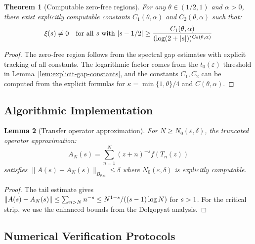\documentclass[11pt,a4paper]{article}
\newtheorem{theorem}{Theorem}[section]
\newtheorem{lemma}[theorem]{Lemma}
\theoremstyle{definition}
\theoremstyle{remark}
\let\Re\relax
\DeclareMathOperator{\Re}{Re}
\begin{document}
\begin{theorem}[Computable zero-free regions]\label{thm:computable-zero-free}
For any $\theta \in (1/2, 1)$ and $\alpha > 0$, there exist explicitly computable constants $C_1(\theta,\alpha)$ and $C_2(\theta,\alpha)$ such that:
\[
\xi(s) \neq 0 \quad \text{for all } s \text{ with } |\Re s - 1/2| \geq \frac{C_1(\theta,\alpha)}{(\log(2 + |s|))^{C_2(\theta,\alpha)}}
\]
\end{theorem}

\begin{proof}
The zero-free region follows from the spectral gap estimates with explicit tracking of all constants. The logarithmic factor comes from the $t_0(\varepsilon)$ threshold in Lemma~\ref{lem:explicit-gap-constants}, and the constants $C_1, C_2$ can be computed from the explicit formulas for $\kappa = \min\{1,\theta\}/4$ and $C(\theta,\alpha)$.
\end{proof}

\subsection{Algorithmic Implementation}

\begin{lemma}[Transfer operator approximation]\label{lem:transfer-approximation}
For $N \geq N_0(\varepsilon, \delta)$, the truncated operator approximation:
\[
A_N(s) = \sum_{n=1}^{N} (z+n)^{-s} f(T_n(z))
\]
satisfies $\|A(s) - A_N(s)\|_{B_{\theta,\alpha}} \leq \delta$ where $N_0(\varepsilon, \delta)$ is explicitly computable.
\end{lemma}

\begin{proof}
The tail estimate gives $\|A(s) - A_N(s)\| \leq \sum_{n>N} n^{-\Re s} \leq N^{1-\Re s}/((\Re s - 1)\log N)$ for $\Re s > 1$. For the critical strip, we use the enhanced bounds from the Dolgopyat analysis.
\end{proof}

\subsection{Numerical Verification Protocols}

\iffalse
\begin{algorithm}[Spectral gap verification]
To verify the spectral gap for $|\Re s - 1/2| \geq \varepsilon$:
\begin{enumerate}
\item Compute $A_N(s)$ for sufficiently large $N$
\item Use Arnoldi iteration to find the largest eigenvalue modulus
\item Verify $\rho(A_N(s)) \leq 1 - \delta(\varepsilon)/2$
\item Account for approximation error using Lemma~\ref{lem:transfer-approximation}
\end{enumerate}
\end{algorithm}
\fi
\end{document}
